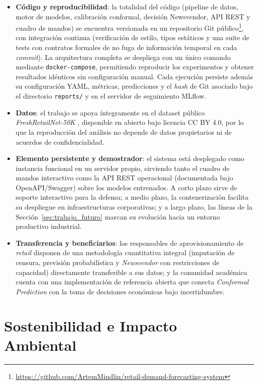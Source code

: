 \begin{itemize}
    \item \textbf{Código y reproducibilidad}: la totalidad del código (pipeline de datos, motor de modelos, calibración conformal, decisión Newsvendor, API REST y cuadro de mandos) se encuentra versionada en un repositorio Git público\footnote{\url{https://github.com/ArtemMindlin/retail-demand-forecasting-system}}, con integración continua (verificación de estilo, tipos estáticos y una suite de tests con contratos formales de no fuga de información temporal en cada \textit{commit}). La arquitectura completa se despliega con un único comando mediante \texttt{docker-compose}, permitiendo reproducir los experimentos y obtener resultados idénticos sin configuración manual. Cada ejecución persiste además su configuración YAML, métricas, predicciones y el \textit{hash} de Git asociado bajo el directorio \texttt{reports/} y en el servidor de seguimiento MLflow.
    \item \textbf{Datos}: el trabajo se apoya íntegramente en el dataset público \textit{FreshRetailNet-50K} \cite{freshretailnet2025}, disponible en abierto bajo licencia CC BY 4.0, por lo que la reproducción del análisis no depende de datos propietarios ni de acuerdos de confidencialidad.
    \item \textbf{Elemento persistente y demostrador}: el sistema está desplegado como instancia funcional en un servidor propio, sirviendo tanto el cuadro de mandos interactivo como la API REST operacional (documentada bajo OpenAPI/Swagger) sobre los modelos entrenados. A corto plazo sirve de soporte interactivo para la defensa; a medio plazo, la contenerización facilita su despliegue en infraestructuras corporativas; y a largo plazo, las líneas de la Sección~\ref{sec:trabajo_futuro} marcan su evolución hacia un entorno productivo industrial.
    \item \textbf{Transferencia y beneficiarios}: los responsables de aprovisionamiento de \textit{retail} disponen de una metodología cuantitativa integral (imputación de censura, previsión probabilística y \textit{Newsvendor} con restricciones de capacidad) directamente transferible a sus datos; y la comunidad académica cuenta con una implementación de referencia abierta que conecta \textit{Conformal Prediction} con la toma de decisiones económicas bajo incertidumbre.
\end{itemize}

\section{Sostenibilidad e Impacto Ambiental}
\label{sec:sostenibilidad}

